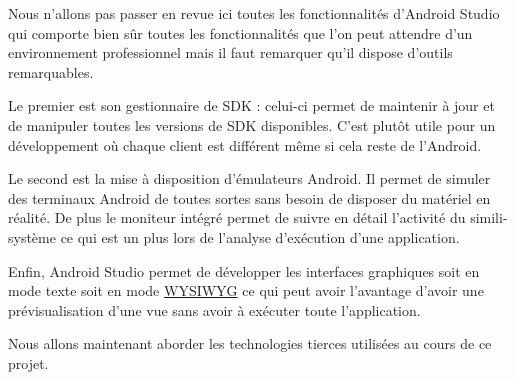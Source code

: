 Nous n’allons pas passer en revue ici toutes les fonctionnalités d’Android Studio qui comporte bien sûr toutes les fonctionnalités que l’on peut attendre d’un environnement professionnel mais il faut remarquer qu’il dispose d’outils remarquables.

Le premier est son gestionnaire de SDK : celui-ci permet de maintenir à jour et de manipuler toutes les versions de SDK disponibles. C’est plutôt utile pour un développement où chaque client est différent même si cela reste de l’Android.

Le second est la mise à disposition d’émulateurs Android. Il permet de simuler des terminaux Android de toutes sortes sans besoin de disposer du matériel en réalité. De plus le moniteur intégré permet de suivre en détail l’activité du simili-système ce qui est un plus lors de l’analyse d’exécution d’une application.

Enfin, Android Studio permet de développer les interfaces graphiques soit en mode texte soit en mode \underline{WYSIWYG} ce qui peut avoir l’avantage d’avoir une prévisualisation d’une vue sans avoir à exécuter toute l’application.

Nous allons maintenant aborder les technologies tierces utilisées au cours de ce projet.